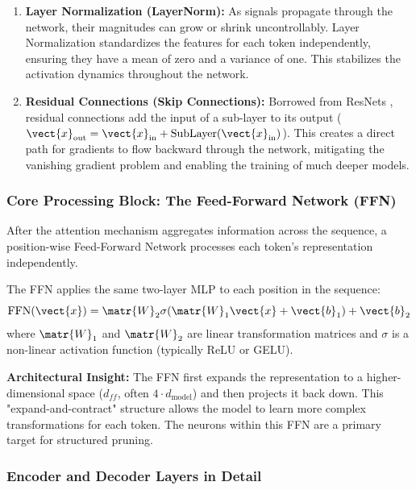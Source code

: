 \begin{enumerate}
    \item \textbf{Layer Normalization (LayerNorm):} As signals propagate through the network, their magnitudes can grow or shrink uncontrollably. Layer Normalization standardizes the features for each token independently, ensuring they have a mean of zero and a variance of one. This stabilizes the activation dynamics throughout the network.


    \item \textbf{Residual Connections (Skip Connections):} Borrowed from ResNets \cite{He2016}, residual connections add the input of a sub-layer to its output ($\vect{x}_{\text{out}} = \vect{x}_{\text{in}} + \text{SubLayer}(\vect{x}_{\text{in}})$). This creates a direct path for gradients to flow backward through the network, mitigating the vanishing gradient problem and enabling the training of much deeper models.

\end{enumerate}
\subsubsection{Core Processing Block: The Feed-Forward Network (FFN)}

After the attention mechanism aggregates information across the sequence, a position-wise Feed-Forward Network processes each token's representation independently.

The FFN applies the same two-layer MLP to each position in the sequence:
  \begin{equation}
    \text{FFN}(\vect{x}) = \matr{W}_2 \sigma(\matr{W}_1 \vect{x} + \vect{b}_1) + \vect{b}_2
  \end{equation}
  where $\matr{W}_1$ and $\matr{W}_2$ are linear transformation matrices and $\sigma$ is a non-linear activation function (typically ReLU or GELU).

\textbf{Architectural Insight:} The FFN first expands the representation to a higher-dimensional space ($d_{ff}$, often $4 \cdot d_{\text{model}}$) and then projects it back down. This "expand-and-contract" structure allows the model to learn more complex transformations for each token. The neurons within this FFN are a primary target for structured pruning.

\subsubsection{Encoder and Decoder Layers in Detail}

